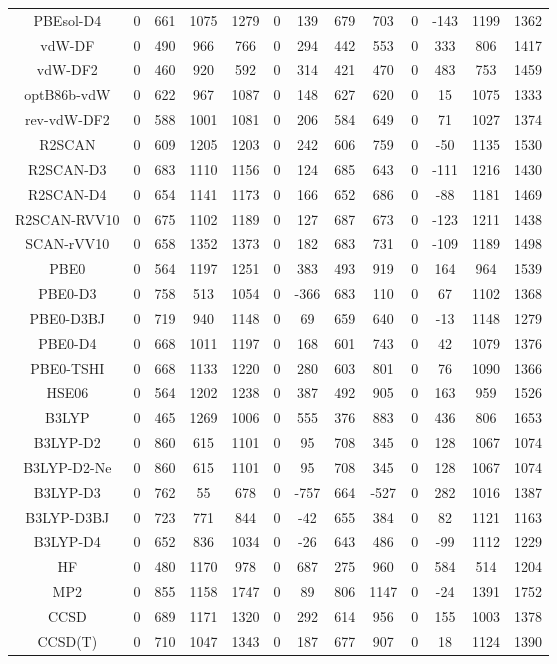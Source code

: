 \begin{table}[ht]
\begin{tabular}{ccccccccccccc}
PBEsol-D4 & 0 & 661 & 1075 & 1279 & 0 & 139 & 679 & 703 & 0 & -143 & 1199 & 1362 \\ 
vdW-DF & 0 & 490 & 966 & 766 & 0 & 294 & 442 & 553 & 0 & 333 & 806 & 1417 \\ 
vdW-DF2 & 0 & 460 & 920 & 592 & 0 & 314 & 421 & 470 & 0 & 483 & 753 & 1459 \\ 
optB86b-vdW & 0 & 622 & 967 & 1087 & 0 & 148 & 627 & 620 & 0 & 15 & 1075 & 1333 \\ 
rev-vdW-DF2 & 0 & 588 & 1001 & 1081 & 0 & 206 & 584 & 649 & 0 & 71 & 1027 & 1374 \\ 
R2SCAN & 0 & 609 & 1205 & 1203 & 0 & 242 & 606 & 759 & 0 & -50 & 1135 & 1530 \\ 
R2SCAN-D3 & 0 & 683 & 1110 & 1156 & 0 & 124 & 685 & 643 & 0 & -111 & 1216 & 1430 \\ 
R2SCAN-D4 & 0 & 654 & 1141 & 1173 & 0 & 166 & 652 & 686 & 0 & -88 & 1181 & 1469 \\ 
R2SCAN-RVV10 & 0 & 675 & 1102 & 1189 & 0 & 127 & 687 & 673 & 0 & -123 & 1211 & 1438 \\ 
SCAN-rVV10 & 0 & 658 & 1352 & 1373 & 0 & 182 & 683 & 731 & 0 & -109 & 1189 & 1498 \\ 
PBE0 & 0 & 564 & 1197 & 1251 & 0 & 383 & 493 & 919 & 0 & 164 & 964 & 1539 \\ 
PBE0-D3 & 0 & 758 & 513 & 1054 & 0 & -366 & 683 & 110 & 0 & 67 & 1102 & 1368 \\ 
PBE0-D3BJ & 0 & 719 & 940 & 1148 & 0 & 69 & 659 & 640 & 0 & -13 & 1148 & 1279 \\ 
PBE0-D4 & 0 & 668 & 1011 & 1197 & 0 & 168 & 601 & 743 & 0 & 42 & 1079 & 1376 \\ 
PBE0-TSHI & 0 & 668 & 1133 & 1220 & 0 & 280 & 603 & 801 & 0 & 76 & 1090 & 1366 \\ 
HSE06 & 0 & 564 & 1202 & 1238 & 0 & 387 & 492 & 905 & 0 & 163 & 959 & 1526 \\ 
B3LYP & 0 & 465 & 1269 & 1006 & 0 & 555 & 376 & 883 & 0 & 436 & 806 & 1653 \\ 
B3LYP-D2 & 0 & 860 & 615 & 1101 & 0 & 95 & 708 & 345 & 0 & 128 & 1067 & 1074 \\ 
B3LYP-D2-Ne & 0 & 860 & 615 & 1101 & 0 & 95 & 708 & 345 & 0 & 128 & 1067 & 1074 \\ 
B3LYP-D3 & 0 & 762 & 55 & 678 & 0 & -757 & 664 & -527 & 0 & 282 & 1016 & 1387 \\ 
B3LYP-D3BJ & 0 & 723 & 771 & 844 & 0 & -42 & 655 & 384 & 0 & 82 & 1121 & 1163 \\ 
B3LYP-D4 & 0 & 652 & 836 & 1034 & 0 & -26 & 643 & 486 & 0 & -99 & 1112 & 1229 \\ 
HF & 0 & 480 & 1170 & 978 & 0 & 687 & 275 & 960 & 0 & 584 & 514 & 1204 \\ 
MP2 & 0 & 855 & 1158 & 1747 & 0 & 89 & 806 & 1147 & 0 & -24 & 1391 & 1752 \\ 
CCSD & 0 & 689 & 1171 & 1320 & 0 & 292 & 614 & 956 & 0 & 155 & 1003 & 1378 \\ 
CCSD(T) & 0 & 710 & 1047 & 1343 & 0 & 187 & 677 & 907 & 0 & 18 & 1124 & 1390 \\ 
\hline\hline
\end{tabular}
\end{table}